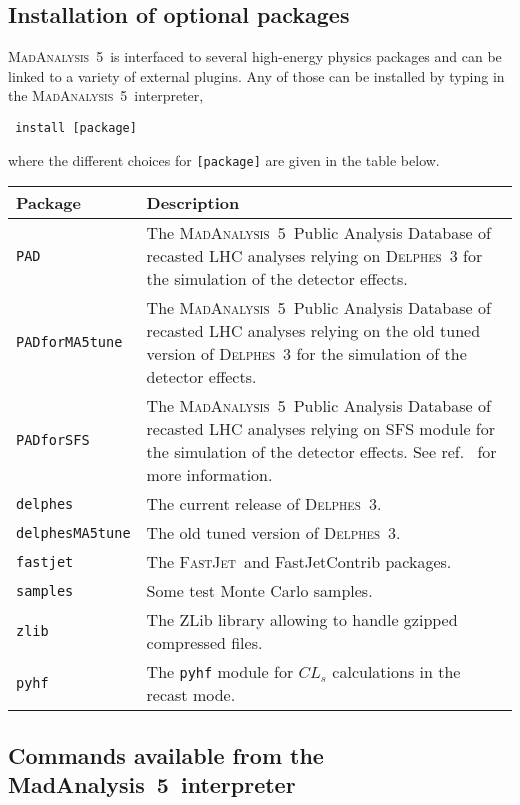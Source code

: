 \documentclass[a4paper]{article}
\newcommand{\MA}{\textsc{MadAnalysis}~5}
\newcommand{\MAnorm}{{MadAnalysis}~5}
\newcommand{\FJ}{\textsc{FastJet}}
\newcommand{\DEL}{\textsc{Delphes}}
\begin{document}
\begin{shaded}
\section{\Large Installation of optional packages}
\label{sec:install}\end{shaded}

\noindent \MA\ is interfaced to several high-energy physics packages and can be linked to
a variety of external plugins. Any of those can be installed by typing in the
\MA\ interpreter,
{\color{ao}\begin{verbatim} install [package]\end{verbatim}}
where the different choices for \verb+[package]+ are given in the table below.
\renewcommand{\arraystretch}{1.2}%
\begin{center}\begin{tabular}{l p{9.2cm}}
\hline
Package & Description\\
\hline
\color{ao} \verb?PAD?            & The \MA\ Public Analysis Database of recasted LHC
   analyses relying on \DEL~3 for the simulation of the detector effects.\\
\color{ao}\verb?PADforMA5tune?  & The \MA\ Public Analysis Database of recasted LHC
   analyses relying on the old tuned version of \DEL~3 for the simulation of the
   detector effects.\\
\color{ao}\verb?PADforSFS?  & The \MA\ Public Analysis Database of recasted LHC
analyses relying on SFS module for the simulation of the detector effects. See ref.~\cite{Araz:2020lnp} for more information.\\
\color{ao}\verb?delphes?        & The current release of \DEL~3.\\
\color{ao}\verb?delphesMA5tune? & The old tuned version of \DEL~3.\\
\color{ao}\verb?fastjet?        & The \FJ\ and {\sc FastJetContrib} packages.\\
\color{ao}\verb?samples?        & Some test Monte Carlo samples.\\
\color{ao}\verb?zlib?           & The {\sc ZLib} library allowing to handle gzipped
                        compressed files.\\
\color{ao}\verb?pyhf?           & The \texttt{pyhf} module for $CL_s$ calculations in the recast mode.\\
\hline
\end{tabular}
\end{center}
\vspace{2cm}
\begin{shaded}
\section{\Large Commands available from the \MAnorm\ interpreter}
\end{shaded}
\end{document}
